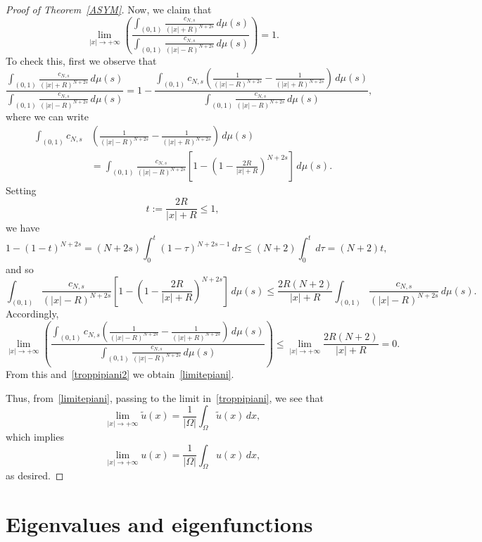 \documentclass[12pt,a4paper,intlimits,sumlimits]{amsart}
\theoremstyle{definition}
\theoremstyle{plain}
\numberwithin{equation}{section}
\renewcommand{\leq}{\leqslant}
\begin{document}
\begin{proof}[Proof of Theorem~\ref{ASYM}]
Now, we claim that
\begin{equation}\label{limitepiani}
\lim_{|x|\to +\infty}\left(
\dfrac{\displaystyle\int_{(0,1)} \frac{c_{N,s}}{(|x|+R)^{N+2s}}\,d\mu(s)}{\displaystyle\int_{(0,1)} \frac{c_{N,s}}{(|x|-R)^{N+2s}}\,d\mu(s)} \right) =1.
\end{equation}
To check this, first we observe that
\begin{equation}\label{troppipiani2}
\dfrac{\displaystyle\int_{(0,1)} \frac{c_{N,s}}{(|x|+R)^{N+2s}}\,d\mu(s)}{\displaystyle\int_{(0,1)} \frac{c_{N,s}}{(|x|-R)^{N+2s}}\,d\mu(s)}
=1-\dfrac{\displaystyle\int_{(0,1)} c_{N,s}\left(\frac{1}{(|x|-R)^{N+2s}}-\frac{1}{(|x|+R)^{N+2s}}\right)\,d\mu(s)}{\displaystyle\int_{(0,1)} \frac{c_{N,s}}{(|x|-R)^{N+2s}}\,d\mu(s)},
\end{equation}
where we can write
\[
\begin{aligned}
\int_{(0,1)} c_{N,s}&\left(\frac{1}{(|x|-R)^{N+2s}}-\frac{1}{(|x|+R)^{N+2s}}\right)\,d\mu(s) \\
&=\int_{(0,1)}\frac{c_{N,s}}{(|x|-R)^{N+2s}}
\left[ 1- \left(1- \frac{2R}{|x|+R}\right)^{N+2s}\right]\,d\mu(s).
\end{aligned}
\]
Setting 
\[
t:=\frac{2R}{|x|+R}\leq 1, 
\]
we have
\[
1-(1-t)^{N+2s}= (N+2s)\int_0^t (1-\tau)^{N+2s-1}\,d\tau
\leq (N+2)\int_0^t \,d\tau= (N+2)t,
\]
and so
\[
\int_{(0,1)}\frac{c_{N,s}}{(|x|-R)^{N+2s}}
\left[ 1- \left(1- \frac{2R}{|x|+R}\right)^{N+2s}\right]\,d\mu(s)
\leq \frac{2R(N+2)}{|x|+R}
\int_{(0,1)}\frac{c_{N,s}}{(|x|-R)^{N+2s}}\,d\mu(s).
\]
Accordingly,
\[
\lim_{|x|\to +\infty}
\left(\dfrac{\displaystyle\int_{(0,1)} c_{N,s}\left(\frac{1}{(|x|-R)^{N+2s}}-\frac{1}{(|x|+R)^{N+2s}}\right)\,d\mu(s)}{\displaystyle\int_{(0,1)} \frac{c_{N,s}}{(|x|-R)^{N+2s}}\,d\mu(s)}\right)
\leq \lim_{|x|\to +\infty}\frac{2R(N+2)}{|x|+R}=0.
\]
{F}rom this and~\eqref{troppipiani2} we obtain~\eqref{limitepiani}.

Thus, from~\eqref{limitepiani}, passing to the limit in~\eqref{troppipiani}, we see that
\[
\lim_{|x|\to +\infty}\tilde{u}(x)
= \frac{1}{|\Omega|}\int_\Omega \tilde{u}(x)\,dx,
\]
which implies 
\[
\lim_{|x|\to +\infty}u(x)
= \frac{1}{|\Omega|}\int_\Omega u(x)\,dx,
\]
as desired.
\end{proof}

\section{Eigenvalues and eigenfunctions}\label{xPSJODLOJDFLFVOLNF023woer}
\end{document}
